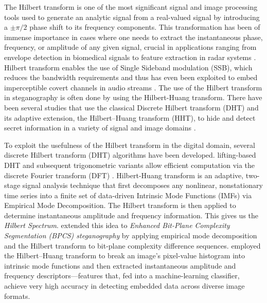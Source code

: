 \documentclass[11pt]{article}
\theoremstyle{plain}
\theoremstyle{definition}
\theoremstyle{remark}
\begin{document}
The Hilbert transform is one of the most significant signal and image processing tools used to generate an analytic signal from a real-valued signal by introducing a $\pm\pi/2$ phase shift to its frequency components. This transformation has been of immense importance in cases where one needs to extract the instantaneous phase, frequency, or amplitude of any given signal, crucial in applications ranging from envelope detection in biomedical signals to feature extraction in radar systems \citep{Hilbert2006,Hahn1996HilbertTI,oppenheim2021discrete,Feldman2008TheoreticalAA,khare2022vhers}. Hilbert transform enables the use of Single Sideband modulation (SSB), which reduces the bandwidth requirements and thus has even been exploited to embed imperceptible covert channels in audio streams \citep{Li2011,hilbertHiding2006}. The use of the Hilbert transform in steganography is often done by using the Hilbert-Huang transform. There have been several studies that use the classical Discrete Hilbert transform (DHT) and its adaptive extension, the Hilbert--Huang transform (HHT), to hide and detect secret information in a variety of signal and image domains \citep{hilberthuang,kandregula2009,wu2011detection,sharma2022hilbert}.

To exploit the usefulness of the Hilbert transform in the digital domain, several discrete Hilbert transform (DHT) algorithms have been developed. \citet{Kak1970DHT} lifting-based DHT and subsequent trigonometric variants allow efficient computation via the discrete Fourier transform (DFT) \citep{kak1977discrete,DHT2}. Hilbert-Huang transform is an adaptive, two-stage signal analysis technique that first decomposes any nonlinear, nonstationary time series into a finite set of data-driven Intrinsic Mode Functions (IMFs) via Empirical Mode Decomposition. The Hilbert transform is then applied to determine instantaneous amplitude and frequency information. This gives us the \textit{Hilbert Spectrum}. \citet{tan2007steganalysis} extended this idea to \textit{Enhanced Bit-Plane Complexity Segmentation (BPCS) steganography} by applying empirical mode decomposition and the Hilbert transform to bit-plane complexity difference sequences. \citet{wu2011detection} employed the Hilbert--Huang transform to break an image's pixel-value histogram into intrinsic mode functions and then extracted instantaneous amplitude and frequency descriptors---features that, fed into a machine-learning classifier, achieve very high accuracy in detecting embedded data across diverse image formats.
\end{document}
